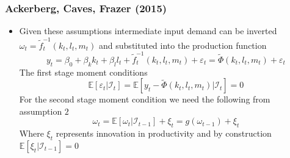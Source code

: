 \documentclass{beamer}
\begin{document}
\begin{frame}
\frametitle{Ackerberg, Caves, Frazer (2015)}
\begin{itemize}
	\item Given these assumptions intermediate input demand can be inverted $\omega_{t}=\tilde{f}_{t}^{-1}(k_{t}, l_{t}, m_{t})$ and substituted into the production function
	\begin{equation}
		y_{t}=\beta_{0}+\beta_{k}k_{t}+\beta_{l}l_{t}+\tilde{f}_{t}^{-1}(k_{t}, l_{t}, m_{t})+\varepsilon_{t}=\tilde{\Phi}(k_{t}, l_{t}, m_{t})+\varepsilon_{t}
	\end{equation}
	The first stage moment conditions
	\begin{equation}
		\mathbb{E}[\varepsilon_{t}|\mathcal{I}_{t}]=\mathbb{E}[y_{t}-\tilde{\Phi}(k_{t}, l_{t}, m_{t})|\mathcal{I}_{t}]=0
	\end{equation}
	For the second stage moment condition we need the following from assumption $2$
	\begin{equation}
		\omega_{t}=\mathbb{E}[\omega_{t}|\mathcal{I}_{t-1}]+\xi_{t}=g(\omega_{t-1})+\xi_{t}
	\end{equation}
	Where $\xi_{t}$ represents innovation in productivity and by construction $\mathbb{E}[\xi_{t}|\mathcal{I}_{t-1}]=0$
\end{itemize}
\end{frame}

\end{document}
